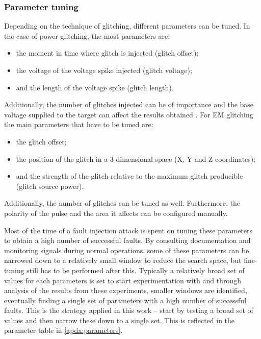 \documentclass[10pt]{article}
\begin{document}
    \subsubsection{Parameter tuning }
    \label{sec:parameters-tuning}
      Depending on the technique of glitching, different parameters can be tuned. 
      In the case of power glitching, the most parameters are: 
      \begin{itemize}
        \item the moment in time where glitch is injected (glitch offset); 
        \item the voltage of the voltage spike injected (glitch voltage); 
        \item and the length of the voltage spike (glitch length). 
      \end{itemize}
      \noindent Additionally, the number of glitches injected can be of importance and the base voltage supplied to the target can affect the results obtained \cite{massolino_smart_2015}.  
      For EM glitching the main parameters that have to be tuned are: 
      \begin{itemize}
        \item the glitch offset; 
        \item the position of the glitch in a 3 dimensional space (X, Y and Z coordinates); 
        \item and the strength of the glitch relative to the maximum glitch producible (glitch source power). 
      \end{itemize}
      \noindent Additionally, the number of glitches can be tuned as well. Furthermore, the polarity of the pulse and the area it affects can be configured manually. 

      Most of the time of a fault injection attack is spent on tuning these parameters to obtain a high number of successful faults. By consulting documentation and monitoring signals during normal operations, some of these parameters can be narrowed down to a relatively small window to reduce the search space, but fine-tuning still has to be performed after this. Typically a relatively broad set of values for each parameters is set to start experimentation with and through analysis of the results from these experiments, smaller windows are identified, eventually finding a single set of parameters with a high number of successful faults. This is the strategy applied in this work -- start by testing a broad set of values and then narrow these down to a single set. This is reflected in the parameter table in \autoref{apdx:parameters}.
\end{document}
